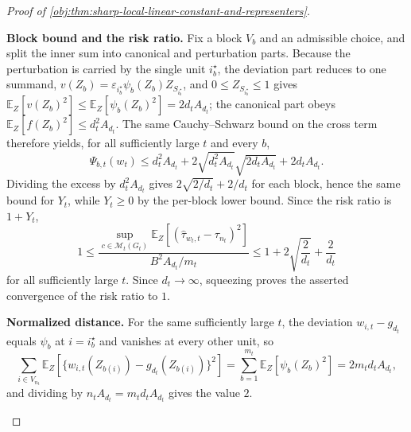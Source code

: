 \begin{proof}[Proof of \cref{obj:thm:sharp-local-linear-constant-and-representers}]
\begin{enumerate}
\textbf{Block bound and the risk ratio.}  Fix a block \(V_b\) and an admissible choice, and split the inner sum into canonical and perturbation parts.  Because the perturbation is carried by the single unit \(i_b^\star\), the deviation part reduces to one summand, \(v(Z_b)=\varepsilon_{i_b^\star}\psi_b(Z_b)Z_{S_{i_b^\star}}\), and \(0\le Z_{S_{i_b^\star}}\le1\) gives \(\mathbb E_Z[v(Z_b)^2]\le\mathbb E_Z[\psi_b(Z_b)^2]=2d_tA_{d_t}\); the canonical part obeys \(\mathbb E_Z[f(Z_b)^2]\le d_t^2A_{d_t}\).  The same Cauchy--Schwarz bound on the cross term therefore yields, for all sufficiently large \(t\) and every \(b\),
\[
\Psi_{b,t}(w_t)
\le
d_t^2A_{d_t}
+2\sqrt{d_t^2A_{d_t}}\sqrt{2d_tA_{d_t}}
+2d_tA_{d_t}.
\]
Dividing the excess by \(d_t^2A_{d_t}\) gives \(2\sqrt{2/d_t}+2/d_t\) for each block, hence the same bound for \(Y_t\), while \(Y_t\ge0\) by the per-block lower bound.  Since the risk ratio is \(1+Y_t\),
\[
1
\le
\frac{
\sup_{c\in\mathcal M_t(G_t)}\mathbb E_Z[(\widehat\tau_{w_t,t}-\tau_{n_t})^2]
}{
B^2A_{d_t}/m_t
}
\le
1+2\sqrt{\frac{2}{d_t}}+\frac{2}{d_t}
\]
for all sufficiently large \(t\).  Since \(d_t\to\infty\), squeezing proves the asserted convergence of the risk ratio to \(1\). %

\textbf{Normalized distance.}  For the same sufficiently large \(t\), the deviation \(w_{i,t}-g_{d_t}\) equals \(\psi_b\) at \(i=i_b^\star\) and vanishes at every other unit, so
\[
\sum_{i\in V_{n_t}}
\mathbb E_Z\!\left[\bigl\{w_{i,t}(Z_{b(i)})-g_{d_t}(Z_{b(i)})\bigr\}^2\right]
=
\sum_{b=1}^{m_t}\mathbb E_Z\!\left[\psi_b(Z_b)^2\right]
=
2m_td_tA_{d_t},
\]
and dividing by \(n_tA_{d_t}=m_td_tA_{d_t}\) gives the value \(2\). %


\end{enumerate}
\end{proof}
